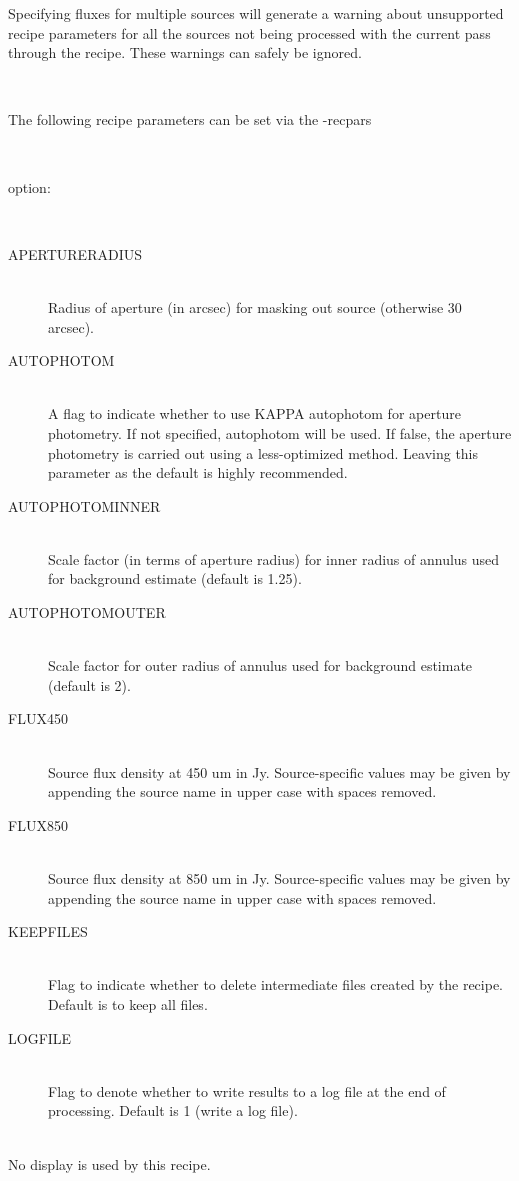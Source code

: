 \documentclass[twoside,11pt]{article}
\renewcommand{\_}{\texttt{\symbol{95}}}
\newcommand{\sstsubsection}[1]{ \item[{#1}] \mbox{} \\}
\newcommand{\sstdiytopic}[2]{\item[{\hspace{-0.35em}#1\hspace{-0.35em}:}]
\mbox{} \\[1.3ex] #2}
\newcommand{\sstdiylist}[2]{
   \item[#1:] \mbox{} \\
   \vspace{-3.5ex}
   \begin{description}
      #2
   \end{description}
}
\newcommand{\sstitem}{\item}
\newcommand{\sstsubsection}[1]{\item[{#1}]}
\newcommand{\sstdiytopic}[2]{\item[{#1}] #2 }
\newcommand{\sstitem}{\item}
\begin{document}
{{{         \sstitem
         Specifying fluxes for multiple sources will generate a warning
         about unsupported recipe parameters for all the sources not being
         processed with the current pass through the recipe. These warnings
         can safely be ignored.
      }
   }
   \sstdiylist{
      Available Parameters
   }{
      \sstsubsection{
         The following recipe parameters can be set via the -recpars
      }{
      }
      \sstsubsection{
         option:
      }{
      }
      \sstsubsection{
         APERTURE\_RADIUS
      }{
         Radius of aperture (in arcsec) for masking out source
         (otherwise 30 arcsec).
      }
      \sstsubsection{
         AUTOPHOTOM
      }{
         A flag to indicate whether to use KAPPA autophotom for aperture
         photometry. If not specified, autophotom will be used. If
         false, the aperture photometry is carried out using a
         less-optimized method. Leaving this parameter as the default is
         highly recommended.
      }
      \sstsubsection{
         AUTOPHOTOM\_INNER
      }{
         Scale factor (in terms of aperture radius) for inner radius of
         annulus used for background estimate (default is 1.25).
      }
      \sstsubsection{
         AUTOPHOTOM\_OUTER
      }{
         Scale factor for outer radius of annulus used for background
         estimate (default is 2).
      }
      \sstsubsection{
         FLUX\_450
      }{
         Source flux density at 450 um in Jy. Source-specific values may
         be given by appending the source name in upper case with spaces
         removed.
      }
      \sstsubsection{
         FLUX\_850
      }{
         Source flux density at 850 um in Jy. Source-specific values may
         be given by appending the source name in upper case with spaces
         removed.
      }
      \sstsubsection{
         KEEPFILES
      }{
         Flag to indicate whether to delete intermediate files created
         by the recipe. Default is to keep all files.
      }
      \sstsubsection{
         LOGFILE
      }{
         Flag to denote whether to write results to a log file at the
         end of processing. Default is 1 (write a log file).
      }
   }
   \sstdiytopic{
      Display
   }{
      No display is used by this recipe.
   }
}
\newpage
\end{document}
